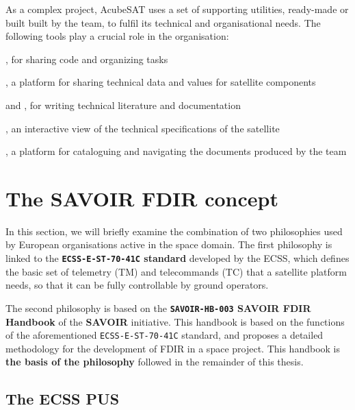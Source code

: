 \documentclass[a4paper,nobib]{tufte-book}
\begin{document}
As a complex project, AcubeSAT uses a set of supporting utilities, ready-made or built built by the team, to fulfil its technical and organisational needs. The following tools play a crucial role in the organisation:
\begin{compactitem}
	\item {}, for sharing code and organizing tasks
	\item {}, a platform for sharing technical data and values for satellite components
	\item {} and , for writing technical literature and documentation
	\item {}, an interactive view of the technical specifications of the satellite
	\item {}, a platform for cataloguing and navigating the documents produced by the team
\end{compactitem}

\chapter{The SAVOIR \ac{FDIR} concept}
\label{cap:savoir}

In this section, we will briefly examine the combination of two philosophies used by European organisations active in the space domain. The first philosophy is linked to the \textbf{\texttt{ECSS-E-ST-70-41C} standard} \autocite{ECSS-E-ST-70-41C} developed by the \acf{ECSS}, which defines the basic set of telemetry (\acs{TM}) and telecommands (\acs{TC}) that a satellite platform needs, so that it can be fully controllable by ground operators.

The second philosophy is based on the \textbf{\texttt{SAVOIR-HB-003} \acs{SAVOIR} \acs{FDIR} Handbook} \autocite{SAVOIR-HB-003} of the \textbf{\acf{SAVOIR}} initiative. This handbook is based on the functions of the aforementioned \texttt{ECSS-E-ST-70-41C} standard, and proposes a detailed methodology for the development of \ac{FDIR} in a space project. This handbook is \textbf{the basis of the philosophy} followed in the remainder of this thesis.

\section{The \acs{ECSS} \acl{PUS}}
\label{sec:pus}
\end{document}
